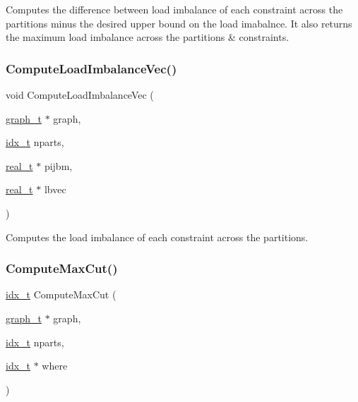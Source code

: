 Computes the difference between load imbalance of each constraint across the partitions minus the desired upper bound on the load imabalnce. It also returns the maximum load imbalance across the partitions \& constraints. \mbox{\label{a00945_a33a2df75ee1df15a8853bef52fd47559}} 
\subsubsection{\texorpdfstring{Compute\+Load\+Imbalance\+Vec()}{ComputeLoadImbalanceVec()}}
{\footnotesize\ttfamily void Compute\+Load\+Imbalance\+Vec (\begin{DoxyParamCaption}\item[{\hyperlink{a00734}{graph\+\_\+t} $\ast$}]{graph,  }\item[{\hyperlink{a00876_aaa5262be3e700770163401acb0150f52}{idx\+\_\+t}}]{nparts,  }\item[{\hyperlink{a00876_a1924a4f6907cc3833213aba1f07fcbe9}{real\+\_\+t} $\ast$}]{pijbm,  }\item[{\hyperlink{a00876_a1924a4f6907cc3833213aba1f07fcbe9}{real\+\_\+t} $\ast$}]{lbvec }\end{DoxyParamCaption})}

Computes the load imbalance of each constraint across the partitions. \mbox{\label{a00945_a2c579207b8d0c26ec7e5bebbdceaa73d}} 
\subsubsection{\texorpdfstring{Compute\+Max\+Cut()}{ComputeMaxCut()}}
{\footnotesize\ttfamily \hyperlink{a00876_aaa5262be3e700770163401acb0150f52}{idx\+\_\+t} Compute\+Max\+Cut (\begin{DoxyParamCaption}\item[{\hyperlink{a00734}{graph\+\_\+t} $\ast$}]{graph,  }\item[{\hyperlink{a00876_aaa5262be3e700770163401acb0150f52}{idx\+\_\+t}}]{nparts,  }\item[{\hyperlink{a00876_aaa5262be3e700770163401acb0150f52}{idx\+\_\+t} $\ast$}]{where }\end{DoxyParamCaption})}

